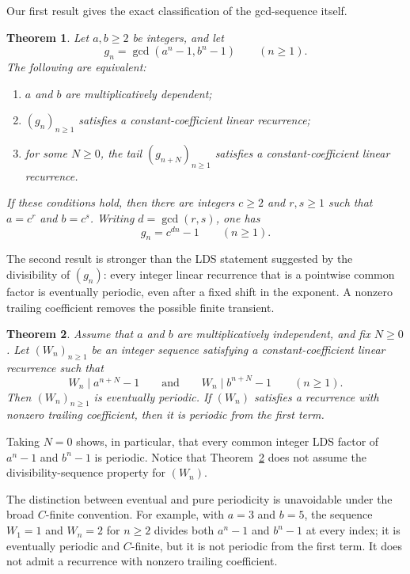 \documentclass[11pt]{amsart}
\newtheorem{theorem}{Theorem}[section]
\theoremstyle{remark}
\numberwithin{equation}{section}
\begin{document}
Our first result gives the exact classification of the gcd-sequence itself.

\begin{theorem}\label{thm:classification}
Let $a,b\ge 2$ be integers, and let
\[
  g_n=\gcd(a^n-1,b^n-1)\qquad(n\ge 1).
\]
The following are equivalent:
\begin{enumerate}[label=\textup{(\arabic*)},leftmargin=2.5em]
  \item $a$ and $b$ are multiplicatively dependent;
  \item $(g_n)_{n\ge 1}$ satisfies a constant-coefficient linear recurrence;
  \item for some $N\ge 0$, the tail $(g_{n+N})_{n\ge 1}$ satisfies a
  constant-coefficient linear recurrence.
\end{enumerate}
If these conditions hold, then there are integers $c\ge 2$ and $r,s\ge 1$ such
that $a=c^r$ and $b=c^s$.  Writing $d=\gcd(r,s)$, one has
\[
  g_n=c^{dn}-1\qquad(n\ge 1).
\]
\end{theorem}

The second result is stronger than the LDS statement suggested by the divisibility
of $(g_n)$: every integer linear recurrence that is a pointwise common factor is
eventually periodic, even after a fixed shift in the exponent.  A nonzero trailing
coefficient removes the possible finite transient.

\begin{theorem}\label{thm:common-factor}
Assume that $a$ and $b$ are multiplicatively independent, and fix $N\ge 0$.
Let $(W_n)_{n\ge 1}$ be an integer sequence satisfying a constant-coefficient
linear recurrence such that
\begin{equation}\label{eq:common-factor-hypothesis}
  W_n\mid a^{n+N}-1
  \qquad\text{and}\qquad
  W_n\mid b^{n+N}-1
  \qquad(n\ge 1).
\end{equation}
Then $(W_n)_{n\ge 1}$ is eventually periodic.  If $(W_n)$ satisfies a recurrence
with nonzero trailing coefficient, then it is periodic from the first term.
\end{theorem}

Taking $N=0$ shows, in particular, that every common integer LDS factor of
$a^n-1$ and $b^n-1$ is periodic.  Notice that Theorem~\ref{thm:common-factor}
does not assume the divisibility-sequence property for $(W_n)$.

The distinction between eventual and pure periodicity is unavoidable under the broad
$C$-finite convention.  For example, with $a=3$ and $b=5$, the sequence
$W_1=1$ and $W_n=2$ for $n\ge 2$ divides both $a^n-1$ and $b^n-1$ at every
index; it is eventually periodic and $C$-finite, but it is not periodic from the first
term.  It does not admit a recurrence with nonzero trailing coefficient.
\end{document}
